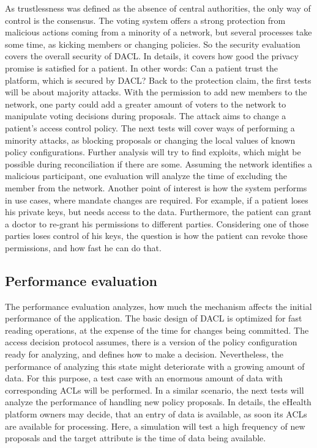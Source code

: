 \documentclass[12pt, conference]{IEEEtran}
\begin{document}
As trustlessness was defined as the absence of central authorities, the only way of control is the consensus. The voting system offers a strong protection from malicious actions coming from a minority of a network, but several processes take some time, as kicking members or changing policies. So the security evaluation covers the overall security of DACL. In details, it covers how good the privacy promise is satisfied for a patient. In other words: Can a patient trust the platform, which is secured by DACL?
Back to the protection claim, the first tests will be about majority attacks. With the permission to add new members to the network, one party could add a greater amount of voters to the network to manipulate voting decisions during proposals. The attack aims to change a patient's access control policy. 
The next tests will cover ways of performing a minority attacks, as blocking proposals or changing the local values of known policy configurations. Further analysis will try to find exploits, which might be possible during reconciliation if there are some.
Assuming the network identifies a malicious participant, one evaluation will analyze the time of excluding the member from the network.
Another point of interest is how the system performs in use cases, where mandate changes are required. For example, if a patient loses his private keys, but needs access to the data. Furthermore, the patient can grant a doctor to re-grant his permissions to different parties. Considering one of those parties loses control of his keys, the question is how the patient can revoke those permissions, and how fast he can do that.


\subsection{Performance evaluation}

The performance evaluation analyzes, how much the mechanism affects the initial performance of the application. The basic design of DACL is optimized for fast reading operations, at the expense of the time for changes being committed. The access decision protocol assumes, there is a version of the policy configuration ready for analyzing, and defines how to make a decision. Nevertheless, the performance of analyzing this state might deteriorate with a growing amount of data. For this purpose, a test case with an enormous amount of data with corresponding ACLs will be performed. 
In a similar scenario, the next tests will analyze the performance of handling new policy proposals. In details, the eHealth platform owners may decide, that an entry of data is available, as soon its ACLs are available for processing. Here, a simulation will test a high frequency of new proposals and the target attribute is the time of data being available.
\end{document}
